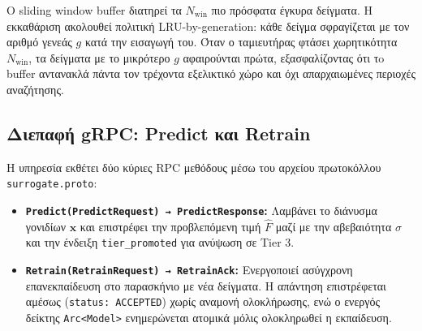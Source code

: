 Ο sliding window buffer διατηρεί τα $N_{\text{win}}$ πιο πρόσφατα έγκυρα δείγματα. Η εκκαθάριση ακολουθεί πολιτική LRU-by-generation: κάθε δείγμα σφραγίζεται με τον αριθμό γενεάς $g$ κατά την εισαγωγή του. Όταν ο ταμιευτήρας φτάσει χωρητικότητα $N_{\text{win}}$, τα δείγματα με το μικρότερο $g$ αφαιρούνται πρώτα, εξασφαλίζοντας ότι τo buffer αντανακλά πάντα τον τρέχοντα εξελικτικό χώρο και όχι απαρχαιωμένες περιοχές αναζήτησης.

\subsection{Διεπαφή gRPC: Predict και Retrain}
\label{subsec:impl_grpc_surrogate}

Η υπηρεσία εκθέτει δύο κύριες RPC μεθόδους μέσω του αρχείου πρωτοκόλλου \texttt{surrogate.proto}:
\begin{itemize}
    \item \textbf{\texttt{Predict(PredictRequest) → PredictResponse}:} Λαμβάνει το διάνυσμα γονιδίων $\mathbf{x}$ και επιστρέφει την προβλεπόμενη τιμή $\hat{F}$ μαζί με την αβεβαιότητα $\sigma$ και την ένδειξη \texttt{tier\_promoted} για ανύψωση σε Tier 3.
    \item \textbf{\texttt{Retrain(RetrainRequest) → RetrainAck}:} Ενεργοποιεί ασύγχρονη επανεκπαίδευση στο παρασκήνιο με νέα δείγματα. Η απάντηση επιστρέφεται αμέσως (\texttt{status: ACCEPTED}) χωρίς αναμονή ολοκλήρωσης, ενώ ο ενεργός δείκτης \texttt{Arc<Model>} ενημερώνεται ατομικά μόλις ολοκληρωθεί η εκπαίδευση.
\end{itemize}

